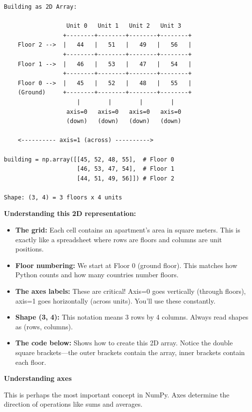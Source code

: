 \begin{tcolorbox}[
    title=Visualizing arrays as buildings,
    colframe=purple,
    colback = white,
    arc=2mm,
    breakable
]
\begin{lstlisting}[basicstyle=\ttfamily\footnotesize,breaklines=true,columns=fullflexible,keepspaces=true,xleftmargin=0pt]
Building as 2D Array:

                  Unit 0   Unit 1   Unit 2   Unit 3
                 +--------+--------+--------+--------+
    Floor 2 -->  |   44   |   51   |   49   |   56   |
                 +--------+--------+--------+--------+
    Floor 1 -->  |   46   |   53   |   47   |   54   |
                 +--------+--------+--------+--------+
    Floor 0 -->  |   45   |   52   |   48   |   55   |
    (Ground)     +--------+--------+--------+--------+
                     |        |        |        |
                  axis=0   axis=0   axis=0   axis=0
                  (down)   (down)   (down)   (down)
    
    <---------- axis=1 (across) ---------->

building = np.array([[45, 52, 48, 55],  # Floor 0
                     [46, 53, 47, 54],  # Floor 1
                     [44, 51, 49, 56]]) # Floor 2

Shape: (3, 4) = 3 floors x 4 units
\end{lstlisting}

\textbf{Understanding this 2D representation:}
\begin{itemize}
\item \textbf{The grid:} Each cell contains an apartment's area in square meters. This is exactly like a spreadsheet where rows are floors and columns are unit positions.
\item \textbf{Floor numbering:} We start at Floor 0 (ground floor). This matches how Python counts and how many countries number floors.
\item \textbf{The axes labels:} These are critical! Axis=0 goes vertically (through floors), axis=1 goes horizontally (across units). You'll use these constantly.
\item \textbf{Shape (3, 4):} This notation means 3 rows by 4 columns. Always read shapes as (rows, columns).
\item \textbf{The code below:} Shows how to create this 2D array. Notice the double square brackets---the outer brackets contain the array, inner brackets contain each floor.
\end{itemize}
\vspace{2em}

\textbf{Understanding axes}

This is perhaps the most important concept in NumPy. Axes determine the direction of operations like sums and averages.


\end{tcolorbox}
